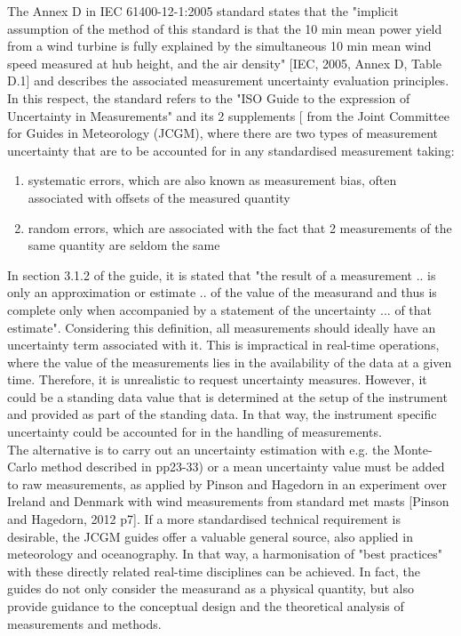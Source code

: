 The Annex D in IEC 61400-12-1:2005 standard states that the "implicit assumption of the method of this standard is that the 10 min mean power yield from a wind turbine is fully explained by the simultaneous 10 min mean wind speed measured at hub height, and the air density" [IEC, 2005, Annex D, Table D.1] and describes the associated measurement uncertainty evaluation principles.  In this respect, the standard refers to the "ISO Guide to the expression of Uncertainty in Measurements" \citep{jcgm2008,jcgm2009,jcgm2012} and its 2 supplements [\citep{jcgm2008a,jcgm2011} from the Joint Committee for Guides in Meteorology (JCGM), where there are two types of measurement uncertainty that are to be accounted for in any standardised measurement taking: 
\begin{enumerate}
    \item systematic errors, which are also known as measurement bias, often associated with offsets of the measured quantity
    \item random errors, which are associated with the fact that 2 measurements of the same quantity are seldom the same
\end{enumerate}

In section 3.1.2 of the guide, \citep{jcgm2008,jcgm2011} it is stated that "the result of a measurement .. is only an approximation or estimate .. of the value of the measurand and thus is complete only when accompanied by a statement of the uncertainty ... of that estimate". Considering this definition, all measurements should ideally have an uncertainty term associated with it. This is impractical in real-time operations, where the value of the measurements lies in the availability of the data at a given time. Therefore, it is unrealistic to request uncertainty measures. However, it could be a standing data value that is determined at the setup of the instrument and provided as part of the standing data. In that way, the instrument specific uncertainty could be accounted for in the handling of measurements.\\ 

The alternative is to carry out an uncertainty estimation with e.g. the Monte-Carlo method described in \citep{jcgm2011} pp23-33) or a mean uncertainty value must be added to raw measurements, as applied by Pinson and Hagedorn in an experiment over Ireland and Denmark with wind measurements from standard met masts [Pinson and Hagedorn, 2012 p7]. If a more standardised technical requirement is desirable, the JCGM guides offer a valuable general source, also applied in meteorology and oceanography. In that way, a harmonisation of "best practices" with these directly related real-time disciplines can be achieved. In fact, the guides do not only consider the measurand as a physical quantity, but also provide guidance to the conceptual design and the theoretical analysis of measurements and methods. 

